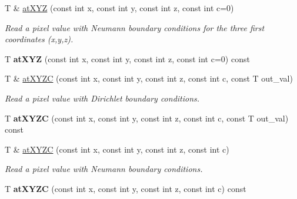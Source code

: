\begin{DoxyCompactItemize}
\item 
\hypertarget{structcimg__library_1_1CImg_af601781e9a52a4da11537ef82ef6c166}{
T \& \hyperlink{structcimg__library_1_1CImg_af601781e9a52a4da11537ef82ef6c166}{atXYZ} (const int x, const int y, const int z, const int c=0)}
\label{structcimg__library_1_1CImg_af601781e9a52a4da11537ef82ef6c166}

\begin{DoxyCompactList}\small\item\em Read a pixel value with Neumann boundary conditions for the three first coordinates ({\ttfamily x},{\ttfamily y},{\ttfamily z}). \item\end{DoxyCompactList}\item 
\hypertarget{structcimg__library_1_1CImg_af73f71a2aee41882186c308f451c4ad0}{
T {\bfseries atXYZ} (const int x, const int y, const int z, const int c=0) const }
\label{structcimg__library_1_1CImg_af73f71a2aee41882186c308f451c4ad0}

\item 
\hypertarget{structcimg__library_1_1CImg_a0ae3f1c140c295f03c46536c46979579}{
T \& \hyperlink{structcimg__library_1_1CImg_a0ae3f1c140c295f03c46536c46979579}{atXYZC} (const int x, const int y, const int z, const int c, const T out\_\-val)}
\label{structcimg__library_1_1CImg_a0ae3f1c140c295f03c46536c46979579}

\begin{DoxyCompactList}\small\item\em Read a pixel value with Dirichlet boundary conditions. \item\end{DoxyCompactList}\item 
\hypertarget{structcimg__library_1_1CImg_a1883fbe5f4ccaaa597095166a64ed146}{
T {\bfseries atXYZC} (const int x, const int y, const int z, const int c, const T out\_\-val) const }
\label{structcimg__library_1_1CImg_a1883fbe5f4ccaaa597095166a64ed146}

\item 
\hypertarget{structcimg__library_1_1CImg_add2b90cd5b60168d48867b1e367956ce}{
T \& \hyperlink{structcimg__library_1_1CImg_add2b90cd5b60168d48867b1e367956ce}{atXYZC} (const int x, const int y, const int z, const int c)}
\label{structcimg__library_1_1CImg_add2b90cd5b60168d48867b1e367956ce}

\begin{DoxyCompactList}\small\item\em Read a pixel value with Neumann boundary conditions. \item\end{DoxyCompactList}\item 
\hypertarget{structcimg__library_1_1CImg_a1bb406e00ce296233e37552ed547032e}{
T {\bfseries atXYZC} (const int x, const int y, const int z, const int c) const }
\label{structcimg__library_1_1CImg_a1bb406e00ce296233e37552ed547032e}


\end{DoxyCompactItemize}
